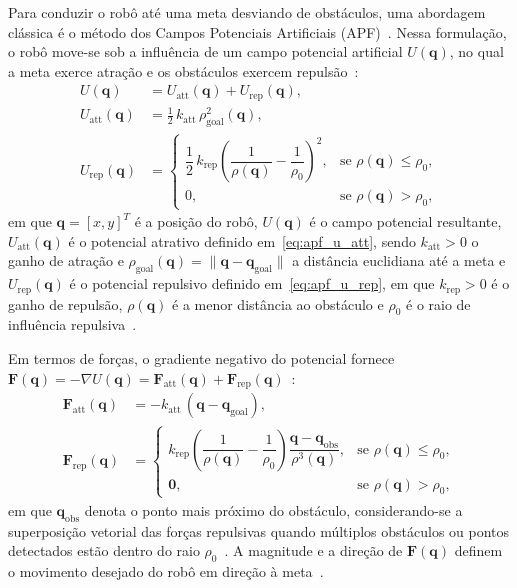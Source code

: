 Para conduzir o robô até uma meta desviando de obstáculos, uma abordagem
clássica é o método dos Campos Potenciais Artificiais
(APF)~\cite{khatib1986,siegwart2004}. Nessa formulação, o robô move-se 
sob a influência de um campo potencial artificial $U(\mathbf{q})$, no 
qual a meta exerce atração e os obstáculos exercem
repulsão~\cite{siegwart2004}: 
\begin{align} 
U(\mathbf{q}) &= U_{\text{att}}(\mathbf{q}) + U_{\text{rep}}(\mathbf{q}),
\label{eq:apf_u_total} \\
U_{\text{att}}(\mathbf{q}) &= \frac{1}{2}\, k_{\text{att}}\,
\rho_{\text{goal}}^2(\mathbf{q}), \label{eq:apf_u_att} \\
U_{\text{rep}}(\mathbf{q}) &=
\begin{cases} 
\dfrac{1}{2}\, k_{\text{rep}} \left( \dfrac{1}{\rho(\mathbf{q})} -     
\dfrac{1}{\rho_0} \right)^2, & \text{se } \rho(\mathbf{q}) \le \rho_0, \\
0, & \text{se } \rho(\mathbf{q}) > \rho_0,
\end{cases} \label{eq:apf_u_rep} 
\end{align} 
em que $\mathbf{q} = [x, y]^T$ é a posição do robô, $U(\mathbf{q})$ é o
campo potencial resultante, $U_{\text{att}}(\mathbf{q})$ é o potencial
atrativo definido em~\eqref{eq:apf_u_att}, sendo $k_{\text{att}} > 0$
o ganho de atração e $\rho_{\text{goal}}(\mathbf{q}) = \|\mathbf{q} -  
\mathbf{q}_{\text{goal}}\|$ a distância euclidiana até a meta e    
$U_{\text{rep}}(\mathbf{q})$ é o potencial repulsivo definido            
em~\eqref{eq:apf_u_rep}, em que $k_{\text{rep}} > 0$ é o ganho de     
repulsão, $\rho(\mathbf{q})$ é a menor distância ao obstáculo e $\rho_0$
é o raio de influência repulsiva~\cite{siegwart2004}. 

Em termos de forças, o gradiente negativo do potencial fornece      
$\mathbf{F}(\mathbf{q}) = -\nabla U(\mathbf{q}) =
\mathbf{F}_{\text{att}}(\mathbf{q}) +
\mathbf{F}_{\text{rep}}(\mathbf{q})$~\cite{siegwart2004}:
\begin{align}
\mathbf{F}_{\text{att}}(\mathbf{q}) &= -k_{\text{att}}\,(\mathbf{q} -    
\mathbf{q}_{\text{goal}}), \label{eq:apf_f_att} \\
\mathbf{F}_{\text{rep}}(\mathbf{q}) &= 
\begin{cases} 
k_{\text{rep}} \left( \dfrac{1}{\rho(\mathbf{q})} - \dfrac{1}{\rho_0} 
\right) \dfrac{\mathbf{q} - \mathbf{q}_{\text{obs}}}{\rho^3(\mathbf{q})}, & \text{se } \rho(\mathbf{q})
\le \rho_0, \\
\mathbf{0}, & \text{se } \rho(\mathbf{q}) > \rho_0,
\end{cases} \label{eq:apf_f_rep}
\end{align}
em que $\mathbf{q}_{\text{obs}}$ denota o ponto mais próximo do obstáculo, considerando-se a superposição vetorial das forças repulsivas quando   
múltiplos obstáculos ou pontos detectados estão dentro do raio
$\rho_0$~\cite{khatib1986}. A magnitude e a direção de          
$\mathbf{F}(\mathbf{q})$ definem o movimento desejado do robô em direção 
à meta~\cite{siegwart2004}.

